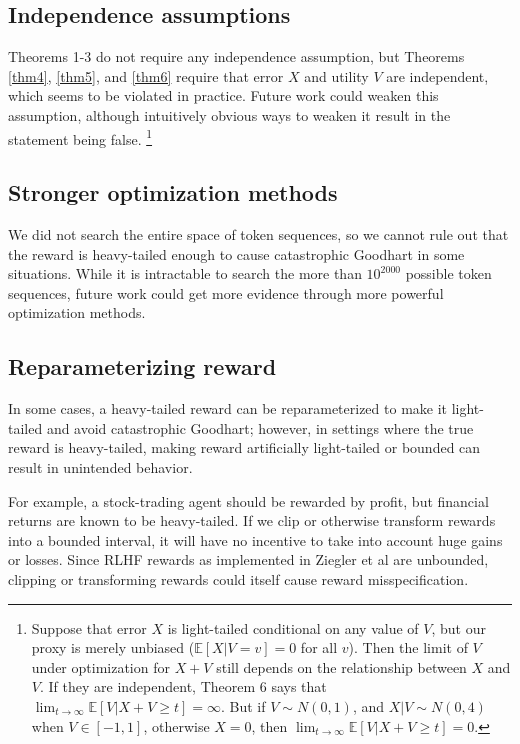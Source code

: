 \documentclass{article}
\begin{document}
\subsection{Independence assumptions}

Theorems 1-3 do not require any independence assumption, but Theorems \ref{thm4}, \ref{thm5}, and \ref{thm6} require that error $X$ and utility $V$ are independent, which seems to be violated in practice. Future work could weaken this assumption, although intuitively obvious ways to weaken it result in the statement being false. \footnote{Suppose that error $X$ is light-tailed conditional on any value of $V$, but our proxy is merely unbiased ($\mathbb E[X|V=v]=0$ for all $v$). Then the limit of $V$ under optimization for $X+V$ still depends on the relationship between $X$ and $V$. If they are independent, Theorem 6 says that \(\lim_{t \to\infty} \mathbb E[V | X + V \ge t] = \infty\). But if \(V \sim N(0, 1)\), and \(X | V \sim N(0, 4)\) when \(V \in [-1, 1]\), otherwise \(X=0\), then \(\lim_{t \to\infty} \mathbb E[V | X + V \ge t] = 0\).} 

\subsection{Stronger optimization methods}

We did not search the entire space of token sequences, so we cannot rule out that the reward is heavy-tailed enough to cause catastrophic Goodhart in some situations. While it is intractable to search the more than $10^{2000}$ possible token sequences, future work could get more evidence through more powerful optimization methods.

\subsection{Reparameterizing reward}

In some cases, a heavy-tailed reward can be reparameterized to make it light-tailed and avoid catastrophic Goodhart; however, in settings where the true reward is heavy-tailed, making reward artificially light-tailed or bounded can result in unintended behavior.

For example, a stock-trading agent should be rewarded by profit, but financial returns are known to be heavy-tailed. If we clip or otherwise transform rewards into a bounded interval, it will have no incentive to take into account huge gains or losses. Since RLHF rewards as implemented in Ziegler et al are unbounded, clipping or transforming rewards could itself cause reward misspecification.
\end{document}
